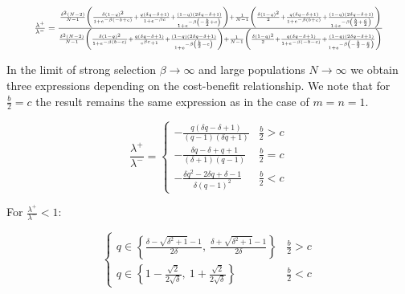 \documentclass[11pt]{article}
\theoremstyle{plainCl1}
\theoremstyle{plainCl2}
\begin{document}
\begin{equation}
  \resizebox{.9\textwidth}{!}
  {%
  $\frac{\lambda^{+}}{\lambda^{-}} =
  \frac{\frac{\delta^{2} \left(N - 2\right)}{N-1} \left(\frac{\delta \left(1 - q\right)^{2}}{1 + e^{- \beta \left(- b + c\right)}} + \frac{q \left(\delta q - \delta + 1\right)}{1 + e^{- \beta c}} + \frac{\left(1 - q\right) \left(2 \delta q - \delta + 1\right)}{1 + e^{- \beta \left(- \frac{b}{2} + c\right)}}\right) + \frac{1}{N-1}\left(\frac{\delta \left(1 - q\right)^{2}}{2} + \frac{q \left(\delta q - \delta + 1\right)}{1 + e^{- \beta \left(b + c\right)}} + \frac{\left(1 - q\right) \left(2 \delta q - \delta + 1\right)}{1 + e^{- \beta \left(\frac{b}{2} + \frac{c}{2}\right)}}\right)}
  {\frac{\delta^{2} \left(N - 2\right)}{N-1} \left(\frac{\delta \left(1 - q\right)^{2}}{1 + e^{- \beta \left(b - c\right)}} + \frac{q \left(\delta q - \delta + 1\right)}{e^{\beta c} + 1} + \frac{\left(1 - q\right) \left(2 \delta q - \delta + 1\right)}{1 + e^{- \beta \left(\frac{b}{2} - c\right)}}\right) + \frac{1}{N-1} \left(\frac{\delta \left(1 - q\right)^{2}}{2} + \frac{q \left(\delta q - \delta + 1\right)}{1 + e^{- \beta \left(- b - c\right)}} + \frac{\left(1 - q\right) \left(2 \delta q - \delta + 1\right)}{1 + e^{- \beta \left(- \frac{b}{2} - \frac{c}{2}\right)}}\right)}
  $}
\end{equation}

In the limit of strong selection \(\beta \rightarrow \infty\) and large
populations \(N \rightarrow \infty \) we obtain three expressions depending on
the cost-benefit relationship. We note that for \(\frac{b}{2}=c\) the result
remains the same expression as in the case of \(m=n=1\).

\begin{equation}
\frac{\lambda^{+}}{\lambda^{-}} = 
\begin{cases}
  - \frac{q \left(\delta q - \delta + 1\right)}{\left(q - 1\right) \left(\delta q + 1\right)}  & \frac{b}{2} > c \\[0.5cm]
  - \frac{\delta q - \delta + q + 1}{\left(\delta + 1\right) \left(q - 1\right)}  & \frac{b}{2} = c \\[0.5cm]
  - \frac{\delta q^{2} - 2 \delta q + \delta - 1}{\delta \left(q - 1\right)^{2}} & \frac{b}{2} < c
\end{cases}
\end{equation}

For \(\frac{\lambda^{+}}{\lambda^{-}} < 1\):

\begin{equation}
\begin{cases}
  q \in \left\{\frac{\delta - \sqrt{\delta^{2} + 1} - 1}{2 \delta}, \  \frac{\delta + \sqrt{\delta^{2} + 1} - 1}{2 \delta}\right\}  & \frac{b}{2} > c \\[0.5cm]
  q \in \left\{1 - \frac{\sqrt{2}}{2 \sqrt{\delta}}, \  1 + \frac{\sqrt{2}}{2 \sqrt{\delta}}\right\} & \frac{b}{2} < c
\end{cases}
\end{equation}
\end{document}
